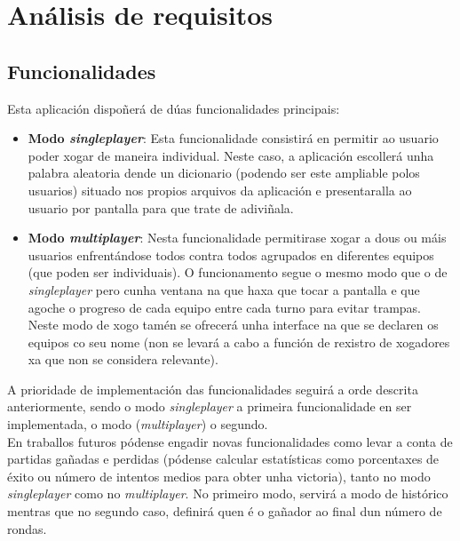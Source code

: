 \chapter{Análisis de requisitos}
\label{chap:requisitos}
\section{Funcionalidades}
Esta aplicación dispoñerá de dúas funcionalidades principais:
\begin{itemize}
    \item \textbf{Modo \textit{singleplayer}}: Esta funcionalidade consistirá en permitir ao usuario poder xogar de maneira individual. Neste caso, a aplicación escollerá unha palabra aleatoria dende un dicionario (podendo ser este ampliable polos usuarios) situado nos propios arquivos da aplicación e presentaralla ao usuario por pantalla para que trate de adiviñala.
    \item \textbf{Modo \textit{multiplayer}}: Nesta funcionalidade permitirase xogar a dous ou máis usuarios enfrentándose todos contra todos agrupados en diferentes equipos (que poden ser individuais). O funcionamento segue o mesmo modo que o de \textit{singleplayer} pero cunha ventana na que haxa que tocar a pantalla e que agoche o progreso de cada equipo entre cada turno para evitar trampas. Neste modo de xogo tamén se ofrecerá unha interface na que se declaren os equipos co seu nome (non se levará a cabo a función de rexistro de xogadores xa que non se considera relevante).
\end{itemize}

A prioridade de implementación das funcionalidades seguirá a orde descrita anteriormente, sendo o modo \textit{singleplayer} a primeira funcionalidade en ser implementada, o modo (\textit{multiplayer}) o segundo. \\
En traballos futuros pódense engadir novas funcionalidades como levar a conta de partidas gañadas e perdidas (pódense calcular estatísticas como porcentaxes de éxito ou número de intentos medios para obter unha victoria), tanto no modo \textit{singleplayer} como no \textit{multiplayer}. No primeiro modo, servirá a modo de histórico mentras que no segundo caso, definirá quen é o gañador ao final dun número de rondas.
 \let\cleardoublepage=\clearpage 